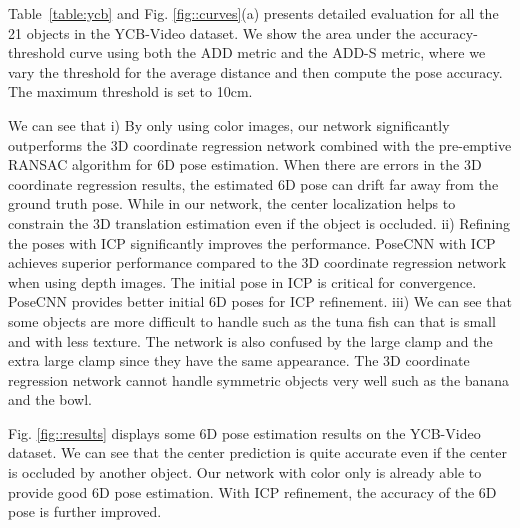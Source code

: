 \documentclass[conference]{IEEEtran}
\begin{document}
Table~\ref{table:ycb} and Fig. \ref{fig::curves}(a) presents detailed evaluation for all the 21 objects in the YCB-Video dataset. We show the area under the accuracy-threshold curve using both the ADD metric and the ADD-S metric, where we vary the threshold for the average distance and then compute the pose accuracy. The maximum threshold is set to 10cm.

We can see that i) By only using color images, our network significantly outperforms the 3D coordinate regression network combined with the pre-emptive RANSAC algorithm for 6D pose estimation. When there are errors in the 3D coordinate regression results, the estimated 6D pose can drift far away from the ground truth pose. While in our network, the center localization helps to constrain the 3D translation estimation even if the object is occluded. ii) Refining the poses with ICP significantly improves the performance. PoseCNN with ICP achieves superior performance compared to the 3D coordinate regression network when using depth images. The initial pose in ICP is critical for convergence. PoseCNN provides better initial 6D poses for ICP refinement. iii) We can see that some objects are more difficult to handle such as the tuna fish can that is small and with less texture. The network is also confused by the large clamp and the extra large clamp since they have the same appearance. The 3D coordinate regression network cannot handle symmetric objects very well such as the banana and the bowl.


Fig. \ref{fig::results} displays some 6D pose estimation results on the YCB-Video dataset. We can see that the center prediction is quite accurate even if the center is occluded by another object. Our network with color only is already able to provide good 6D pose estimation. With ICP refinement, the accuracy of the 6D pose is further improved.
\end{document}
